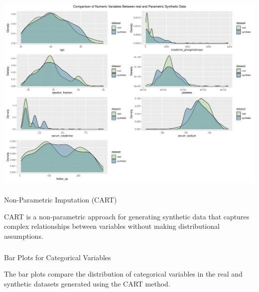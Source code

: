 \documentclass[
  letterpaper,
  DIV=11,
  numbers=noendperiod]{scrartcl}
\makeatletter
\let\oldparagraph\paragraph
\renewcommand{\paragraph}{
    \@ifstar
      \xxxParagraphStar
      \xxxParagraphNoStar
  }
\newcommand{\xxxParagraphStar}[1]{\oldparagraph*{#1}\mbox{}}
\newcommand{\xxxParagraphNoStar}[1]{\oldparagraph{#1}\mbox{}}
\let\oldsubparagraph\subparagraph
\renewcommand{\subparagraph}{
    \@ifstar
      \xxxSubParagraphStar
      \xxxSubParagraphNoStar
  }
\newcommand{\xxxSubParagraphStar}[1]{\oldsubparagraph*{#1}\mbox{}}
\newcommand{\xxxSubParagraphNoStar}[1]{\oldsubparagraph{#1}\mbox{}}
\makeatother
\begin{document}
\begin{center}
\includegraphics[width=1\linewidth,height=\textheight,keepaspectratio]{heart_failure_synthetic_data_project_files/figure-pdf/Density plots for numeric variables (parametric imputed data)-1.pdf}
\end{center}

\paragraph{Non-Parametric Imputation
(CART)}\label{non-parametric-imputation-cart-1}

CART is a non-parametric approach for generating synthetic data that
captures complex relationships between variables without making
distributional assumptions.

\subparagraph{Bar Plots for Categorical
Variables}\label{bar-plots-for-categorical-variables-1}

The bar plots compare the distribution of categorical variables in the
real and synthetic datasets generated using the CART method.
\end{document}
